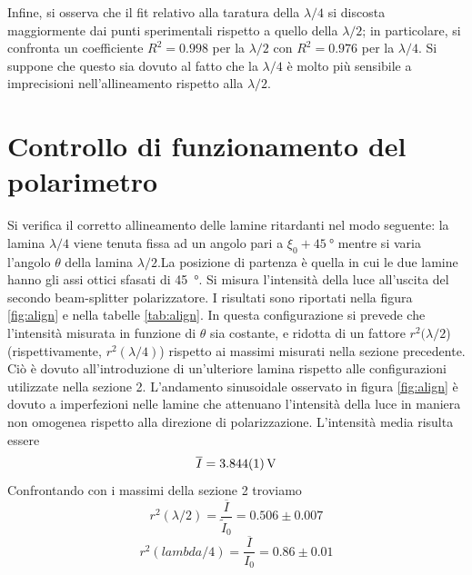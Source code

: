 \documentclass[10pt,oneside,a4paper]{article}
\begin{document}
\begin{multicols}{2}
Infine, si osserva che il fit relativo alla taratura della $\lambda/4$ si discosta maggiormente dai punti sperimentali rispetto a quello della $\lambda/2$; in particolare, si confronta un coefficiente $R^2 = 0.998$ per la $\lambda/2$ con $R^2 = 0.976$ per la $\lambda/4$. Si suppone che questo sia dovuto al fatto che la $\lambda/4$ è molto più sensibile a imprecisioni nell'allineamento rispetto alla $\lambda/2$.


\section{Controllo di funzionamento del polarimetro}

Si verifica il corretto allineamento delle lamine ritardanti nel modo seguente: la lamina $\lambda/4$ viene tenuta fissa ad un angolo pari a $\xi_0 + 45\SI{}{\degree}$ mentre si varia l'angolo $\theta$ della lamina $\lambda/2$.La posizione di partenza è quella in cui le due lamine hanno gli assi ottici sfasati di 45\SI{}{\degree}. Si misura l'intensità della luce all'uscita del secondo beam-splitter polarizzatore. I risultati sono riportati nella figura \ref{fig:align} e nella tabelle \ref{tab:align}. In questa configurazione  si prevede che l'intensità misurata in funzione di $\theta$ sia costante, e ridotta di un fattore $r^2(\lambda / 2$) (rispettivamente, $r^2(\lambda/4)$) rispetto ai  massimi misurati nella sezione precedente. Ciò è dovuto all'introduzione di un'ulteriore lamina rispetto alle configurazioni utilizzate nella sezione 2. L'andamento sinusoidale osservato in figura \ref{fig:align} è dovuto a imperfezioni nelle lamine che attenuano l'intensità della luce in maniera non omogenea rispetto alla direzione di polarizzazione. L'intensità media risulta essere 
$$\overline{I} = \SI{3.844 \pm 0.001}{V}$$
Confrontando con i massimi della sezione 2 troviamo 
$$r^2(\lambda / 2) = \frac{\overline{I}}{\tilde{I}_0} = 0.506 \pm 0.007$$
$$r^2(lambda / 4) = \frac{\overline{I}}{I_0} = 0.86 \pm 0.01$$


\end{multicols}
\end{document}
